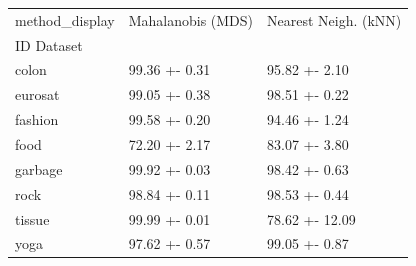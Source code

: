 \begin{tabular}{lll}
\toprule
method_display & Mahalanobis (MDS) & Nearest Neigh. (kNN) \\
ID Dataset &  &  \\
\midrule
colon & 99.36 +- 0.31 & 95.82 +- 2.10 \\
eurosat & 99.05 +- 0.38 & 98.51 +- 0.22 \\
fashion & 99.58 +- 0.20 & 94.46 +- 1.24 \\
food & 72.20 +- 2.17 & 83.07 +- 3.80 \\
garbage & 99.92 +- 0.03 & 98.42 +- 0.63 \\
rock & 98.84 +- 0.11 & 98.53 +- 0.44 \\
tissue & 99.99 +- 0.01 & 78.62 +- 12.09 \\
yoga & 97.62 +- 0.57 & 99.05 +- 0.87 \\
\bottomrule
\end{tabular}
